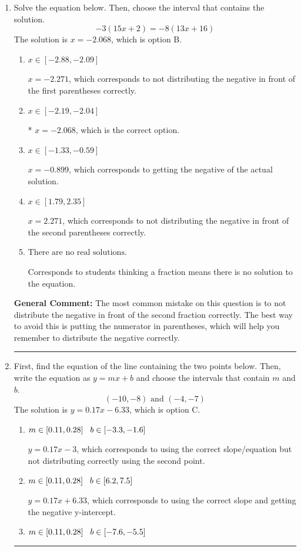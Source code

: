 \documentclass{extbook}[14pt]
\newcommand{\litem}[1]{\item #1

\rule{\textwidth}{0.4pt}}
\begin{document}
\begin{enumerate}\litem{
Solve the equation below. Then, choose the interval that contains the solution.
\[ -3(15x + 2) = -8(13x + 16) \]The solution is \( x = -2.068 \), which is option B.\begin{enumerate}[label=\Alph*.]
\item \( x \in [-2.88, -2.09] \)

$x = -2.271$, which corresponds to not distributing the negative in front of the first parentheses correctly.
\item \( x \in [-2.19, -2.04] \)

* $x = -2.068$, which is the correct option.
\item \( x \in [-1.33, -0.59] \)

$x = -0.899$, which corresponds to getting the negative of the actual solution.
\item \( x \in [1.79, 2.35] \)

$x = 2.271$, which corresponds to not distributing the negative in front of the second parentheses correctly.
\item \( \text{There are no real solutions.} \)

Corresponds to students thinking a fraction means there is no solution to the equation.
\end{enumerate}

\textbf{General Comment:} The most common mistake on this question is to not distribute the negative in front of the second fraction correctly. The best way to avoid this is putting the numerator in parentheses, which will help you remember to distribute the negative correctly.
}
\litem{
First, find the equation of the line containing the two points below. Then, write the equation as $ y=mx+b $ and choose the intervals that contain $m$ and $b$.
\[ (-10, -8) \text{ and } (-4, -7) \]The solution is \( y = 0.17x -6.33 \), which is option C.\begin{enumerate}[label=\Alph*.]
\item \( m \in [0.11, 0.28] \hspace*{3mm} b \in [-3.3, -1.6] \)

 $y = 0.17x -3$, which corresponds to using the correct slope/equation but not distributing correctly using the second point.
\item \( m \in [0.11, 0.28] \hspace*{3mm} b \in [6.2, 7.5] \)

 $y = 0.17x + 6.33$, which corresponds to using the correct slope and getting the negative y-intercept.
\item \( m \in [0.11, 0.28] \hspace*{3mm} b \in [-7.6, -5.5] \)


\end{enumerate}}
\end{enumerate}
\end{document}
